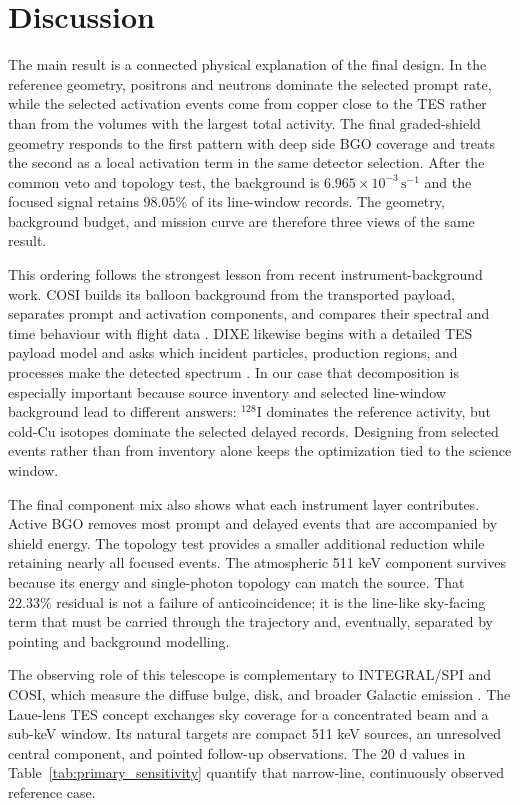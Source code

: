 \documentclass[11pt]{article}
\newcommand{\cps}{\ensuremath{\,\mathrm{s^{-1}}}}
\begin{document}
\section{Discussion}
\label{sec:discussion}

The main result is a connected physical explanation of the final design. In the
reference geometry, positrons and neutrons dominate the selected prompt rate, while
the selected activation events come from copper close to the TES rather than from
the volumes with the largest total activity. The final graded-shield geometry responds to the
first pattern with deep side BGO coverage and treats the second as a local activation
term in the same detector selection. After the common veto and topology test, the
background is $6.965\times10^{-3}\cps$ and the focused signal retains $98.05\%$
of its line-window records. The geometry, background budget, and mission curve are
therefore three views of the same result.

This ordering follows the strongest lesson from recent instrument-background work.
COSI builds its balloon background from the transported payload, separates prompt
and activation components, and compares their spectral and time behaviour with
flight data \cite{Gallego2025Balloon}. DIXE likewise begins with a detailed TES
payload model and asks which incident particles, production regions, and processes
make the detected spectrum \cite{Tian2026DIXE}. In our case that decomposition is
especially important because source inventory and selected line-window background
lead to different answers: $^{128}$I dominates the reference activity, but cold-Cu
isotopes dominate the selected delayed records. Designing from selected events
rather than from inventory alone keeps the optimization tied to the science window.

The final component mix also shows what each instrument layer contributes. Active
BGO removes most prompt and delayed events that are accompanied by shield energy.
The topology test provides a smaller additional reduction while retaining nearly
all focused events. The atmospheric 511 keV component survives because its energy
and single-photon topology can match the source. That $22.33\%$ residual is not a
failure of anticoincidence; it is the line-like sky-facing term that must be carried
through the trajectory and, eventually, separated by pointing and background
modelling.

The observing role of this telescope is complementary to INTEGRAL/SPI and COSI,
which measure the diffuse bulge, disk, and broader Galactic emission
\cite{Siegert2016AA,Kierans2020,Siegert2020COSI,Yoneda2025,Karwin2023}.
The Laue-lens TES concept exchanges sky coverage for a concentrated beam and a
sub-keV window. Its natural targets are compact 511 keV sources, an unresolved
central component, and pointed follow-up observations. The 20 d values in
Table~\ref{tab:primary_sensitivity} quantify that narrow-line, continuously
observed reference case.
\end{document}
